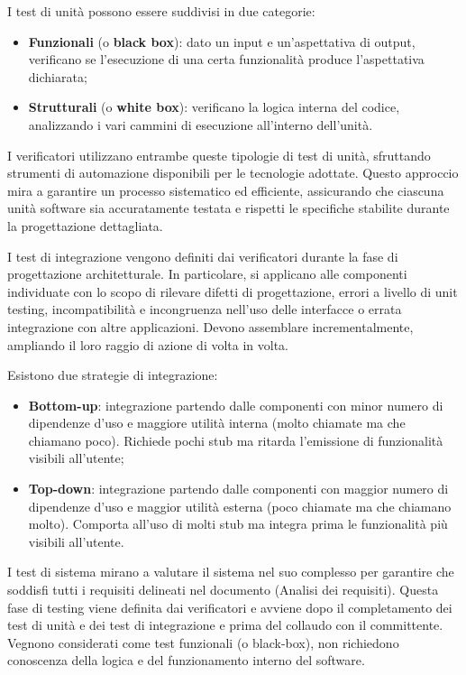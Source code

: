 \documentclass[10pt, a4paper]{article}
\begin{document}
I test di unità possono essere suddivisi in due categorie:
\begin{itemize}
    \item \textbf{Funzionali} (o \textbf{black box}): dato un input e un'aspettativa di output, verificano se l'esecuzione di una certa funzionalità produce l'aspettativa dichiarata;
    \item \textbf{Strutturali} (o \textbf{white box}): verificano la logica interna del codice, analizzando i vari cammini di esecuzione all'interno dell'unità.
\end{itemize}
I verificatori utilizzano entrambe queste tipologie di test di unità, sfruttando strumenti di automazione disponibili per le tecnologie adottate. Questo approccio mira a garantire un processo sistematico ed efficiente, assicurando che ciascuna unità software sia accuratamente testata e rispetti le specifiche stabilite durante la progettazione dettagliata.

I test di integrazione vengono definiti dai verificatori durante la fase di progettazione architetturale. In particolare, si applicano alle componenti individuate con lo scopo di rilevare difetti di progettazione, errori a livello di unit testing, incompatibilità e incongruenza nell'uso delle interfacce o errata integrazione con altre applicazioni. Devono assemblare incrementalmente, ampliando il loro raggio di azione di volta in volta.

Esistono due strategie di integrazione:
\begin{itemize}
    \item \textbf{Bottom-up}: integrazione partendo dalle componenti con minor numero di dipendenze d'uso e maggiore utilità interna (molto chiamate ma che chiamano poco). Richiede pochi stub ma ritarda l'emissione di funzionalità visibili all'utente;
    \item \textbf{Top-down}: integrazione partendo dalle componenti con maggior numero di dipendenze d'uso e maggior utilità esterna (poco chiamate ma che chiamano molto). Comporta all'uso di molti stub ma integra prima le funzionalità più visibili all'utente.
\end{itemize}

I test di sistema mirano a valutare il sistema nel suo complesso per garantire che soddisfi tutti i requisiti delineati nel documento (Analisi dei requisiti). Questa fase di testing viene definita dai verificatori e avviene dopo il completamento dei test di unità e dei test di integrazione e prima del collaudo con il committente.
Vegnono considerati come test funzionali (o black-box), non richiedono conoscenza della logica e del funzionamento interno del software.
\end{document}
